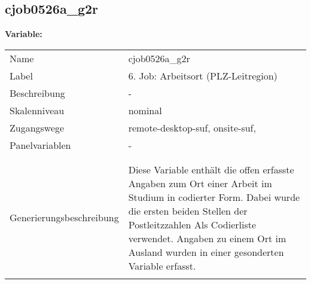 	
	
	\subsection{cjob0526a\_g2r}
	\label{subSection:cjob0526a_g2r}

	\noindent\textbf{Variable:}\\
		\begin{tabular}{lL{11.3cm}}
			\label{tableVariable:cjob0526a_g2r}
			Name & cjob0526a\_g2r \\
			Label & 6. Job: Arbeitsort (PLZ-Leitregion) \\
			Beschreibung & - \\
			Skalenniveau & nominal \\
			Zugangswege &
				remote-desktop-suf,
				onsite-suf,
 \\
			Panelvariablen & -
			 \\
			 \\
 \\
					Generierungsbeschreibung & Diese Variable enthält die offen erfasste Angaben zum Ort einer Arbeit im Studium in codierter Form. Dabei wurde die ersten beiden Stellen der Postleitzzahlen Als Codierliste verwendet. Angaben zu einem Ort im Ausland wurden in einer gesonderten Variable erfasst.
				 \\	
			 \\
		\end{tabular}






